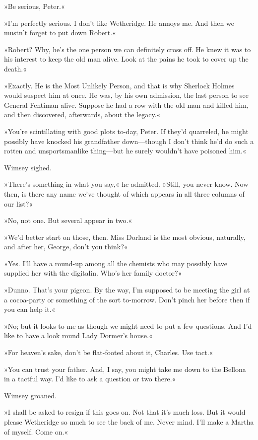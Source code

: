 »Be serious, Peter.«

»I'm perfectly serious. I don't like Wetheridge. He annoys me. And then we mustn't forget to put down Robert.«

»Robert? Why, he's the one person we can definitely cross off. He knew it was to his interest to keep the old man alive. Look at the pains he took to cover up the death.«

»Exactly. He is the Most Unlikely Person, and that is why Sherlock Holmes would suspect him at once. He was, by his own admission, the last person to see General Fentiman alive. Suppose he had a row with the old man and killed him, and then discovered, afterwards, about the legacy.«

»You're scintillating with good plots to-day, Peter. If they'd quarreled, he might possibly have knocked his grandfather down\allowbreak---\allowbreak though I don't think he'd do such a rotten and unsportsmanlike thing\allowbreak---\allowbreak but he surely wouldn't have poisoned him.«

Wimsey sighed.

»There's something in what you say,« he admitted. »Still, you never know. Now then, is there any name we've thought of which appears in all three columns of our list?«

»No, not one. But several appear in two.«

»We'd better start on those, then. Miss Dorland is the most obvious, naturally, and after her, George, don't you think?«

»Yes. I'll have a round-up among all the chemists who may possibly have supplied her with the digitalin. Who's her family doctor?«

»Dunno. That's your pigeon. By the way, I'm supposed to be meeting the girl at a cocoa-party or something of the sort to-morrow. Don't pinch her before then if you can help it.«

»No; but it looks to me as though we might need to put a few questions. And I'd like to have a look round Lady Dormer's house.«

»For heaven's sake, don't be flat-footed about it, Charles. Use tact.«

»You can trust your father. And, I say, you might take me down to the Bellona in a tactful way. I'd like to ask a question or two there.«

Wimsey groaned.

»I shall be asked to resign if this goes on. Not that it's much loss. But it would please Wetheridge so much to see the back of me. Never mind. I'll make a Martha of myself. Come on.«


